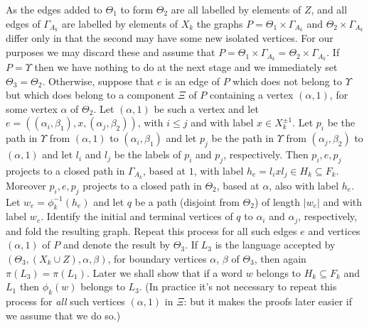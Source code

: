 \documentclass[a4paper,12pt]{article}
\renewcommand{\a}{\alpha }
\renewcommand{\b}{\beta }
\newcommand{\G}{\Gamma }
\newcommand{\T}{\Theta }
\newcommand{\U}{\Upsilon }
\numberwithin{equation}{section}
\numberwithin{figure}{section}
\begin{document}
As the edges added to $\T_1$ to form $\T_2$ are all labelled by elements 
of $Z$, and all edges of $\G_{A_k}$ are labelled by elements of $X_k$ 
the graphs $P=\T_1\times \G_{A_k}$ and $\T_2\times \G_{A_k}$ differ only
in that the second may have some new isolated vertices. For our purposes
we may discard these and assume that $P=\T_1\times \G_{A_k}=
 \T_2\times \G_{A_k}$. If $P=\U$ then we have nothing to do at the
next stage and we immediately set $\T_3=\T_2$. Otherwise, 
suppose that $e$ is an edge of $P$ which does not belong to $\U$ but
which does belong to a component $\Xi$  of $P$ containing a vertex
$(\a,1)$, for some vertex $\a$ of $\T_2$. 
Let $(\a,1)$ be such a vertex and let 
$e=((\a_i,\b_1), x, (\a_j,\b_2))$, 
with $i\le j$ and with label $x\in X_k^{\pm 1}$. 
 Let $p_i$ be   
the path in $\U$ from $(\a,1)$ to $(\a_i,\b_1)$ and let $p_j$ be
the path in $\U$ from  $(\a_j,\b_2)$ to $(\a,1)$ and 
let $l_i$ and $l_j$ be the labels of $p_i$ and $p_j$, respectively. Then 
$p_i,e,p_j$ projects to a closed path in $\G_{A_k}$, based at $1$, with
label $h_e=l_i x l_j \in H_k\subseteq F_k$. Moreover   
$p_i,e,p_j$ projects to a closed path in $\T_2$, based at $\a$, also 
with label $h_e$. Let 
$w_e=\phi_k^{-1}(h_e)$ and let 
$q$ be a path (disjoint from $\T_2$) of length
$|w_e|$ and with label $w_e$. Identify the initial and terminal 
vertices of $q$ to $\a_i$ and $\a_j$, respectively, and fold the
resulting graph. Repeat this process for all such edges $e$ and 
vertices $(\a,1)$ of $P$
and denote the result by $\T_3$. If 
$L_3$ is the
language accepted by $(\T_3,(X_k\cup Z), \a,\b)$, for boundary
vertices $\a$, $\b$ of $\T_3$, then again $\pi(L_3)=\pi(L_1)$. 
Later we shall show that if a word $w$ belongs to $H_k\subseteq F_k$ and 
$L_1$ then
$\phi_k(w)$ belongs to $L_3$. (In practice it's not necessary to 
repeat this process for {\em all} such vertices $(\a,1)$ in $\Xi$: but it
makes the proofs later easier if we assume that we do so.)
\end{document}
